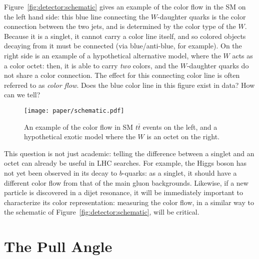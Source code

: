 Figure~\ref{fig:detector:schematic} gives an example of the color flow in the SM on the left hand side: this blue line connecting the $W$-daughter quarks is the color connection between the two jets, and is determined by the color type of the $W$. Because it is a singlet, it cannot carry a color line itself, and so colored objects decaying from it must be connected (via blue/anti-blue, for example). On the right side is an example of a hypothetical alternative model, where the $W$ acts as a color octet: then, it is able to carry \textit{two} colors, and the $W$-daughter quarks do not share a color connection. The effect for this connecting color line is often referred to as \textit{color flow}. Does the blue color line in this figure exist in data? How can we tell?


\begin{figure}
\centering
\texttt{[image: paper/schematic.pdf]}
\label{fig:color:motivation:schematic}
\caption{An example of the color flow in SM $t\bar{t}$ events on the left, and a hypothetical exotic model where the $W$ is an octet on the right.}
\end{figure}


This question is not just academic: telling the difference between a singlet and an octet can already be useful in LHC searches. For example, the Higgs boson has not yet been observed in its decay to $b$-quarks: as a singlet, it should have a different color flow from that of the main gluon backgrounds. Likewise, if a new particle is discovered in a dijet resonance, it will be immediately important to characterize its color representation: measuring the color flow, in a similar way to the schematic of Figure~\ref{fig:detector:schematic}, will be critical. 

\section{The Pull Angle}

